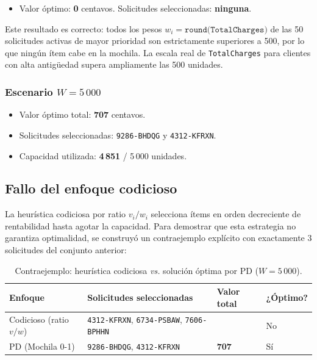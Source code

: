 \documentclass[12pt, a4paper]{article}
\begin{document}
\begin{itemize}
  \item Valor óptimo: \textbf{0} centavos. Solicitudes seleccionadas: \textbf{ninguna}.
\end{itemize}

Este resultado es correcto: todos los pesos $w_i = \texttt{round(TotalCharges)}$ de las 50 solicitudes activas de mayor prioridad son estrictamente superiores a 500, por lo que ningún ítem cabe en la mochila. La escala real de \texttt{TotalCharges} para clientes con alta antigüedad supera ampliamente las 500 unidades.

\subsubsection*{Escenario $W = 5\,000$}

\begin{itemize}
  \item Valor óptimo total: \textbf{707} centavos.
  \item Solicitudes seleccionadas: \texttt{9286-BHDQG} y \texttt{4312-KFRXN}.
  \item Capacidad utilizada: \textbf{4\,851} / 5\,000 unidades.
\end{itemize}

\subsection{Fallo del enfoque codicioso}

La heurística codiciosa por ratio $v_i/w_i$ selecciona ítems en orden decreciente de rentabilidad hasta agotar la capacidad. Para demostrar que esta estrategia no garantiza optimalidad, se construyó un contraejemplo explícito con exactamente 3 solicitudes del conjunto anterior:

\begin{table}[h!]
\centering
\small
\begin{tabularx}{\textwidth}{
  >{\raggedright\arraybackslash}p{4cm}
  >{\raggedright\arraybackslash}X
  >{\centering\arraybackslash}p{2cm}
  >{\centering\arraybackslash}p{1.8cm}
}
\toprule
\textbf{Enfoque} & \textbf{Solicitudes seleccionadas} & \textbf{Valor total} & \textbf{¿Óptimo?} \\
\midrule
Codicioso (ratio $v/w$) & \texttt{4312-KFRXN}, \texttt{6734-PSBAW}, \texttt{7606-BPHHN} & 688 & No \\
PD (Mochila 0-1) & \texttt{9286-BHDQG}, \texttt{4312-KFRXN} & \textbf{707} & Sí \\
\bottomrule
\end{tabularx}
\caption{Contraejemplo: heurística codiciosa \textit{vs.} solución óptima por PD ($W = 5\,000$).}
\end{table}
\end{document}
